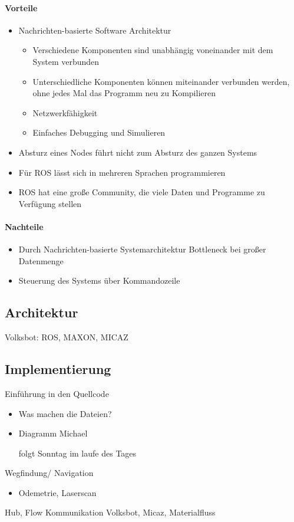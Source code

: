 \paragraph{Vorteile}
\begin{itemize}
 \item Nachrichten-basierte Software Architektur
\begin{itemize}
\item Verschiedene Komponenten sind unabhängig voneinander mit dem System verbunden
\item Unterschiedliche Komponenten können miteinander verbunden werden, ohne jedes Mal das Programm neu zu Kompilieren
\item Netzwerkfähigkeit
\item Einfaches Debugging und Simulieren
\end{itemize}
\item Absturz eines Nodes führt nicht zum Absturz des ganzen
Systems
\item Für ROS lässt sich in mehreren Sprachen programmieren
\item ROS hat eine große Community, die viele Daten und Programme zu Verfügung
stellen
\end{itemize}
\paragraph{Nachteile}
\begin{itemize}
 \item Durch Nachrichten-basierte Systemarchitektur Bottleneck bei großer Datenmenge
\item Steuerung des Systems über Kommandozeile
\end{itemize}

\subsection{Architektur}
Volksbot: ROS, MAXON, MICAZ
\subsection{Implementierung}
Einführung in den Quellcode
\begin{itemize}
\item Was machen die Dateien? 
\item Diagramm Michael

folgt Sonntag im laufe des Tages


\end{itemize}
Wegfindung/ Navigation
\begin{itemize}
\item Odemetrie, Laserscan
\end{itemize}
Hub, Flow
Kommunikation Volksbot, Micaz, Materialfluss

